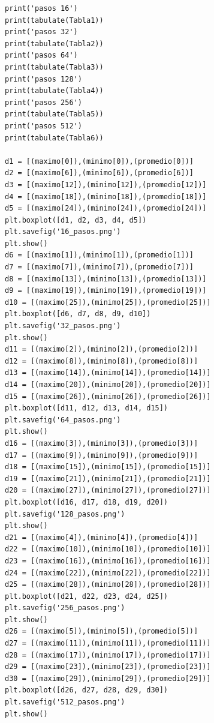 \documentclass[a4paper]{article}
\begin{document}
\begin{verbatim}
print('pasos 16')
print(tabulate(Tabla1))
print('pasos 32')
print(tabulate(Tabla2))
print('pasos 64')
print(tabulate(Tabla3))
print('pasos 128')
print(tabulate(Tabla4))
print('pasos 256')
print(tabulate(Tabla5))
print('pasos 512')
print(tabulate(Tabla6))

d1 = [(maximo[0]),(minimo[0]),(promedio[0])]
d2 = [(maximo[6]),(minimo[6]),(promedio[6])]
d3 = [(maximo[12]),(minimo[12]),(promedio[12])]
d4 = [(maximo[18]),(minimo[18]),(promedio[18])]
d5 = [(maximo[24]),(minimo[24]),(promedio[24])]
plt.boxplot([d1, d2, d3, d4, d5])
plt.savefig('16_pasos.png')
plt.show()
d6 = [(maximo[1]),(minimo[1]),(promedio[1])]
d7 = [(maximo[7]),(minimo[7]),(promedio[7])]
d8 = [(maximo[13]),(minimo[13]),(promedio[13])]
d9 = [(maximo[19]),(minimo[19]),(promedio[19])]
d10 = [(maximo[25]),(minimo[25]),(promedio[25])]
plt.boxplot([d6, d7, d8, d9, d10])
plt.savefig('32_pasos.png')
plt.show()
d11 = [(maximo[2]),(minimo[2]),(promedio[2])]
d12 = [(maximo[8]),(minimo[8]),(promedio[8])]
d13 = [(maximo[14]),(minimo[14]),(promedio[14])]
d14 = [(maximo[20]),(minimo[20]),(promedio[20])]
d15 = [(maximo[26]),(minimo[26]),(promedio[26])]
plt.boxplot([d11, d12, d13, d14, d15])
plt.savefig('64_pasos.png')
plt.show()
d16 = [(maximo[3]),(minimo[3]),(promedio[3])]
d17 = [(maximo[9]),(minimo[9]),(promedio[9])]
d18 = [(maximo[15]),(minimo[15]),(promedio[15])]
d19 = [(maximo[21]),(minimo[21]),(promedio[21])]
d20 = [(maximo[27]),(minimo[27]),(promedio[27])]
plt.boxplot([d16, d17, d18, d19, d20])
plt.savefig('128_pasos.png')
plt.show()
d21 = [(maximo[4]),(minimo[4]),(promedio[4])]
d22 = [(maximo[10]),(minimo[10]),(promedio[10])]
d23 = [(maximo[16]),(minimo[16]),(promedio[16])]
d24 = [(maximo[22]),(minimo[22]),(promedio[22])]
d25 = [(maximo[28]),(minimo[28]),(promedio[28])]
plt.boxplot([d21, d22, d23, d24, d25])
plt.savefig('256_pasos.png')
plt.show()
d26 = [(maximo[5]),(minimo[5]),(promedio[5])]
d27 = [(maximo[11]),(minimo[11]),(promedio[11])]
d28 = [(maximo[17]),(minimo[17]),(promedio[17])]
d29 = [(maximo[23]),(minimo[23]),(promedio[23])]
d30 = [(maximo[29]),(minimo[29]),(promedio[29])]
plt.boxplot([d26, d27, d28, d29, d30])
plt.savefig('512_pasos.png')
plt.show()

\end{verbatim}
 
 
\end{document}

